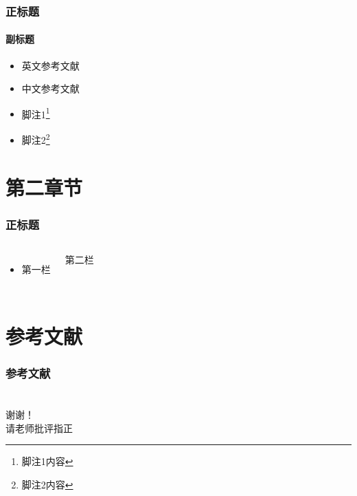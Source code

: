 \documentclass{beamer}
\begin{document}
\begin{frame}
    \frametitle{正标题}
    \framesubtitle{副标题}
    \begin{itemize}
        \item 英文参考文献\cite{test-en}
        \item 中文参考文献\cite{test-zh}
        \item 脚注1\footnote{脚注1内容}
        \item 脚注2\footnote{脚注2内容}
    \end{itemize}
\end{frame}

\section{第二章节}

\begin{frame}
    \frametitle{正标题}
    \begin{columns}
        \begin{itemize}
            \item 第一栏
        \end{itemize}
        第二栏
    \end{columns}
\end{frame}

\section*{参考文献}

\begin{frame}[allowframebreaks]
    \frametitle{参考文献}
    \small
    
    
\end{frame}

\section*{}


\begin{frame}
    \centering
    \Huge 谢谢！\\
    请老师批评指正
\end{frame}
\end{document}
